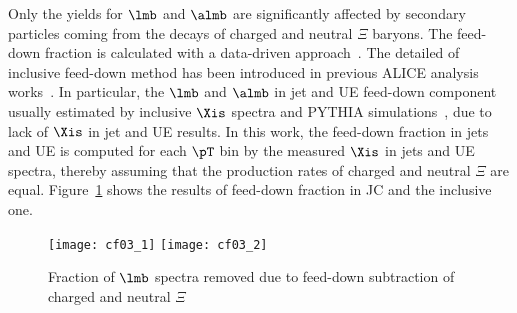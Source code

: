 Only the yields for $\lmb$ and $\almb$ are significantly affected by secondary particles coming from the decays of charged and neutral $\Xi$ baryons. The feed-down fraction is calculated with a data-driven approach~\cite{Abelev:2013haa}. The detailed of inclusive feed-down method has been introduced in previous ALICE analysis works~\cite{Acharya:2019kyh, Acharya:2020uxl, ALICE:2017jyt}. In particular, the $\lmb$ and $\almb$ in jet and UE feed-down component usually estimated by inclusive $\Xis$ spectra and PYTHIA simulations~\cite{V0injet}, due to lack of $\Xis$ in jet and UE results. In this work, the feed-down fraction in jets and UE is computed for each $\pT$ bin by the measured $\Xis$ in jets and UE spectra, thereby assuming that the production rates of charged and neutral $\Xi$ are equal. Figure~\ref{fig:FdFrac} shows the results of feed-down fraction in JC and the inclusive one.
 \begin{figure}[!ht]
 	\begin{center}
 		\texttt{[image: cf03\_1]}
 		\texttt{[image: cf03\_2]}
 	\end{center}
 	\caption{Fraction of $\lmb$ spectra removed due to feed-down subtraction of charged and neutral $\Xi$}
 	\label{fig:FdFrac}
 \end{figure}

